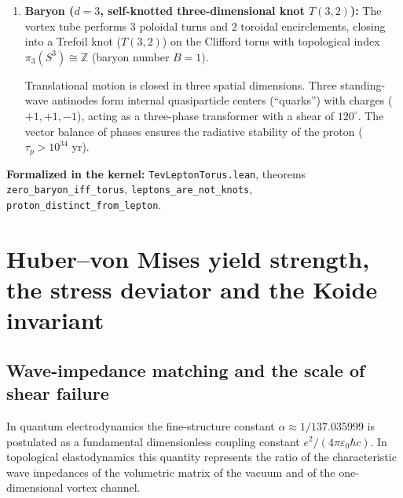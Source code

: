 \documentclass[11pt,a4paper]{article}
\theoremstyle{definition}
\theoremstyle{remark}
\begin{document}
\begin{enumerate}
The degree of tension of the vortex tube on the torus surface forms a discrete generation spectrum with winding $W(n) = (2n-1)/n$:
\begin{itemize}
	\item $n=1$: the electron $(1,1)$ — an unstressed configuration ($\Delta E = 0$, stable);
	\item $n=2$: the muon $(3,2)$ — a compressed spring ($\Delta E = 1/2$, metastable);
	\item $n=3$: the tau-lepton $(5,3)$ — a strongly compressed spring ($\Delta E = 2/3$, decay).
\end{itemize}
		
\item \textbf{Baryon ($d = 3$, self-knotted three-dimensional knot $T(3,2)$):}
The vortex tube performs 3 poloidal turns and 2 toroidal encirclements, closing into a Trefoil knot ($T(3,2)$) on the Clifford torus with topological index $\pi_3(S^3) \cong \mathbb{Z}$ (baryon number $B=1$).
		
		Translational motion is closed in three spatial dimensions. Three standing-wave antinodes form internal quasiparticle centers (``quarks'') with charges ($+1, +1, -1$), acting as a three-phase transformer with a shear of $120^\circ$. The vector balance of phases ensures the radiative stability of the proton ($\tau_p > 10^{34}$ yr).
\end{enumerate}
\noindent\small\textbf{Formalized in the kernel:} \texttt{TevLeptonTorus.lean}, theorems \texttt{zero_baryon_iff_torus}, \texttt{leptons_are_not_knots}, \texttt{proton_distinct_from_lepton}.

\section{Huber--von Mises yield strength, the stress deviator and the Koide invariant}

\subsection{Wave-impedance matching and the scale of shear failure}

In quantum electrodynamics the fine-structure constant $\alpha \approx 1/137.035999$ is postulated as a fundamental dimensionless coupling constant $e^2 / (4\pi \varepsilon_0 \hbar c)$. In topological elastodynamics this quantity represents the ratio of the characteristic wave impedances of the volumetric matrix of the vacuum and of the one-dimensional vortex channel.
\end{document}
